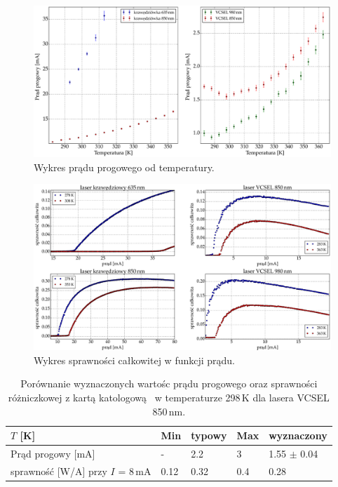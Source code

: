 \begin{figure}
\center
  \includegraphics[scale=0.30]{plot_common/plot_temp_i_th.eps}
  \caption{Wykres prądu progowego od temperatury.}
  \label{fig:plot_temp_i_th}
\end{figure}
\begin{figure}
\center
  \includegraphics[scale=0.30]{plot_common/plot_wall_eff.eps}
  \caption{Wykres sprawności całkowitej w funkcji prądu.}
  \label{fig:plot_wall_eff}
\end{figure}
\newpage



\begin{table}[h!]
\begin{center}
\label{tab:tabela1}
\caption{Porównanie wyznaczonych wartośc  prądu progowego oraz sprawności różniczkowej z kartą katologową~\cite{spec_vcsel_850}
 w temperaturze 298\,K dla lasera VCSEL 850\,nm. }
\begin{tabular}{ | C{3.5cm}|  C{1.5cm} | C{1.5cm} | C{1.5cm}| C{3.5cm}|}
\hline
$T$ [K]           &   Min  & typowy & Max   & wyznaczony        \\ \hline
Prąd progowy [mA] &  -    &  2.2    & 3    & 1.55 $\pm$ 0.04  \\ \hline
sprawność [W/A]  przy $I$ = 8\,mA   &  0.12   &  0.32   & 0.4   & 0.28      \\ \hline
\end{tabular}
\end{center}
\end{table}

